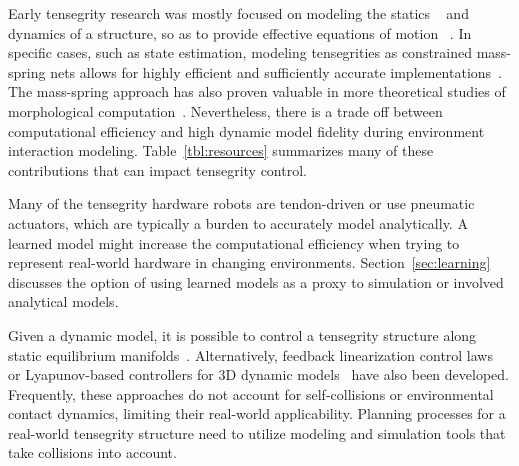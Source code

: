 Early tensegrity research was mostly focused on modeling the statics
~\cite{2003Tensegrity:-Str, Juan2008, Arsenault:2008bh} and dynamics
of a structure, so as to provide effective equations of motion
~\cite{Kanchanasaratool2002Motion-Control-, De-Oliveira:2006ys,
skelton_tensegrity_2009}.  In specific cases, such as state
estimation, modeling tensegrities as constrained mass-spring nets
allows for highly efficient and sufficiently accurate
implementations~\cite{caluwaerts2016esitmation}.  The mass-spring approach
has also proven valuable in more theoretical studies of morphological
computation~\cite{Hauser}. Nevertheless, there is a trade off between
computational efficiency and high dynamic model fidelity during
environment interaction modeling.  Table~\ref{tbl:resources}
summarizes many of these contributions that can impact tensegrity
control.



Many of the tensegrity hardware robots are tendon-driven or use
pneumatic actuators, which are typically a burden to accurately model
analytically. A learned model might increase the computational
efficiency when trying to represent real-world hardware in changing
environments.  Section~\ref{sec:learning} discusses the option of
using learned models as a proxy to simulation or involved analytical
models.


Given a dynamic model, it is possible to control a tensegrity
structure along static equilibrium
manifolds~\cite{Skelton1997Controllable-Te}.  Alternatively, feedback
linearization control laws~\cite{Aldrich2003Control-Synthes} or
Lyapunov-based controllers for 3D dynamic
models~\cite{Wroldsen2006A-Discussion-on} have also been
developed. Frequently, these approaches do not account for
self-collisions or environmental contact dynamics, limiting their
real-world applicability.  Planning processes for a real-world
tensegrity structure need to utilize modeling and simulation tools
that take collisions into account.


